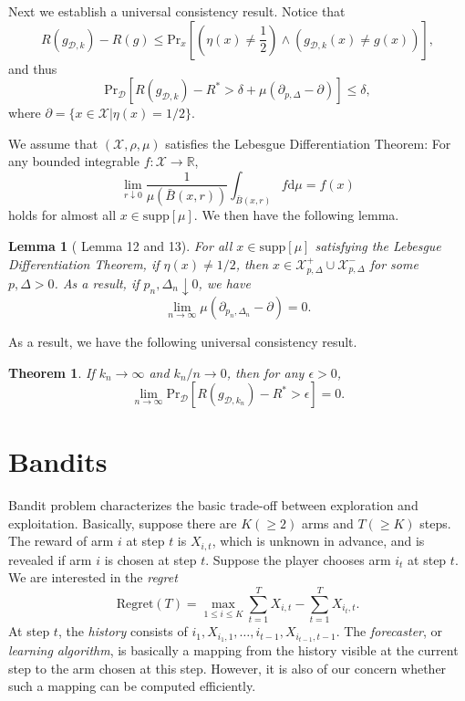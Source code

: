 \documentclass[openany]{book}
\newtheorem{lemma}{Lemma}[chapter]
\newtheorem{theorem}{Theorem}[chapter]
\theoremstyle{definition}
\theoremstyle{remark}
\begin{document}
Next we establish a universal consistency result. Notice that
\begin{equation*}
    R(g_{\mathcal{D},k})-R(g)\le \mathrm{Pr}_x\left[\left(\eta(x)\ne \frac{1}{2}\right)\wedge(g_{\mathcal{D},k}(x)\ne g(x))\right],
\end{equation*}
and thus
\begin{equation*}
    \mathrm{Pr}_{\mathcal{D}}\left[R(g_{\mathcal{D},k})-R^*>\delta+\mu(\partial_{p,\Delta}\!-\partial)\right]\le\delta,
\end{equation*}
where $\partial=\{x\in \mathcal{X}|\eta(x)=1/2\}$.

We assume that $(\mathcal{X},\rho,\mu)$ satisfies the Lebesgue Differentiation Theorem: For any bounded integrable $f:\mathcal{X}\to \mathbb{R}$,
\begin{equation*}
    \lim_{r\downarrow0}\frac{1}{\mu(\bar{B}(x,r))}\int_{\bar{B}(x,r)}f \mathrm{d}\mu=f(x)
\end{equation*}
holds for almost all $x\in \mathrm{supp}[\mu]$. We then have the following lemma.
\begin{lemma}[\cite{CD14} Lemma 12 and 13]
    For all $x\in \mathrm{supp}[\mu]$ satisfying the Lebesgue Differentiation Theorem, if $\eta(x)\ne1/2$, then $x\in \mathcal{X}_{p,\Delta}^+\cup \mathcal{X}_{p,\Delta}^-$ for some $p,\Delta>0$. As a result, if $p_n,\Delta_n\downarrow0$, we have
    \begin{equation*}
        \lim_{n\to\infty}\mu(\partial_{p_n,\Delta_n}\!-\partial)=0.
    \end{equation*}
\end{lemma}
As a result, we have the following universal consistency result.
\begin{theorem}
    If $k_n\to\infty$ and $k_n/n\to0$, then for any $\epsilon>0$,
    \begin{equation*}
        \lim_{n\to\infty}\mathrm{Pr}_{\mathcal{D}}[R(g_{\mathcal{D},k_n})-R^*>\epsilon]=0.
    \end{equation*}
\end{theorem}

\part{Bandits}
Bandit problem characterizes the basic trade-off between exploration and exploitation. Basically, suppose there are $K(\ge2)$ arms and $T(\ge K)$ steps. The reward of arm $i$ at step $t$ is $X_{i,t}$, which is unknown in advance, and is revealed if arm $i$ is chosen at step $t$. Suppose the player chooses arm $i_t$ at step $t$. We are interested in the \emph{regret}
\begin{equation}\label{regret}
    \mathrm{Regret}(T)=\max_{1\le i\le K}\sum_{t=1}^{T}X_{i,t}-\sum_{t=1}^{T}X_{i_t,t}.
\end{equation}
At step $t$, the \emph{history} consists of $i_1,X_{i_1,1},\ldots,i_{t-1},X_{i_{t-1},t-1}$. The \emph{forecaster}, or \emph{learning algorithm}, is basically a mapping from the history visible at the current step to the arm chosen at this step. However, it is also of our concern whether such a mapping can be computed efficiently.
\end{document}
